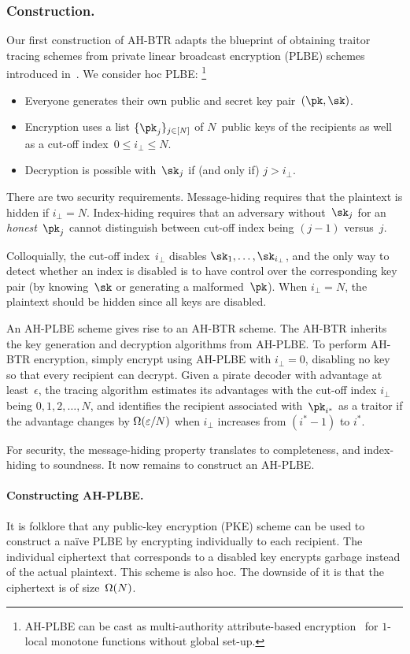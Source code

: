 \subsubsection{Construction.}
Our first construction of AH-BTR adapts the blueprint of  obtaining traitor tracing schemes from private linear broadcast encryption (PLBE) schemes introduced in~\cite{EC:BonSahWat06}.
We consider \ad hoc PLBE:%
\footnote{AH-PLBE can be cast as multi-authority attribute-based encryption~\cite{TCC:Chase07} for $1$-local monotone functions without global set-up.}
\begin{itemize}
\item Everyone generates their own public and secret key pair~$(\pk,\sk)$.
\item Encryption uses a list $\{\pk_j\}_{j\in[N]}$ of $N$~public keys of the recipients as well as a cut-off index~${0\leq i_\bot\leq N}$.
\item Decryption is possible with~$\sk_j$ if (and only if) ${j>i_\bot}$.
\end{itemize}
There are two security requirements.
Message-hiding requires that the plaintext is hidden if ${i_\bot=N}$.
Index-hiding requires that an adversary without~$\sk_j$ for an \emph{honest}~$\pk_j$ cannot distinguish between cut-off index being ${(j-1)}$ versus~$j$.

Colloquially, the cut-off index~$i_\bot$ disables $\sk_1,\dots,\sk_{i_\bot}$, and
the only way to detect whether an index is disabled is to have control over the corresponding key pair (by knowing~$\sk$ or generating a malformed~$\pk$).
When ${i_\bot=N}$, the plaintext should be hidden since all keys are disabled.

An AH-PLBE scheme gives rise to an AH-BTR scheme.
The AH-BTR inherits the key generation and decryption algorithms from AH-PLBE.
To perform AH-BTR encryption, simply encrypt using AH-PLBE with ${i_\bot=0}$, disabling no key so that every recipient can decrypt.
Given a pirate decoder with advantage at least~$\epsilon$, the tracing algorithm estimates its advantages with the cut-off index $i_\bot$ being ${0,1},\allowbreak{2,\dots,N}$, and identifies the recipient associated with~$\pk_{i^\ast}$ as a traitor if the advantage changes by $\operatorname{\Omega}(\varepsilon/N)$ when $i_\bot$ increases from $({i^\ast-1})$ to $i^\ast$.

For security,
the message-hiding property translates to completeness, and index-hiding to soundness.
It now remains to construct an AH-PLBE.

\paragraph{Constructing AH-PLBE.}
It is folklore that any public-key encryption (PKE) scheme can be used to construct a na{\"i}ve PLBE by encrypting individually to each recipient.
The individual ciphertext that corresponds to a disabled key encrypts garbage instead of the actual plaintext.
This scheme is also \ad hoc.
The downside of it is that the ciphertext is of size~$\operatorname{\Omega}(N)$.

